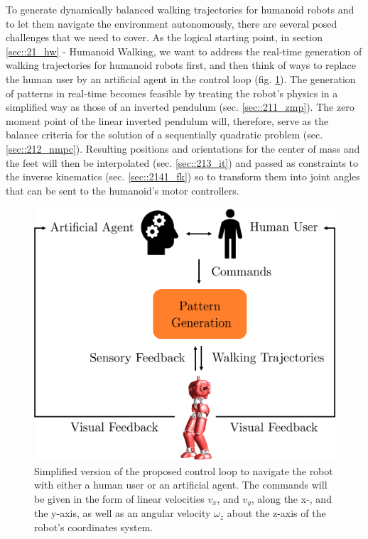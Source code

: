 \label{sec::2_bg}
To generate dynamically balanced walking trajectories for humanoid robots and to let them navigate the environment autonomously, there are several posed challenges that we need to cover. As the logical starting point, in section \ref{sec::21_hw} - Humanoid Walking, we want to address the real-time generation of walking trajectories for humanoid robots first, and then think of ways to replace the human user by an artificial agent in the control loop (fig. \ref{fig::2_cl}). The generation of patterns in real-time becomes feasible by treating the robot's physics in a simplified way as those of an inverted pendulum (sec. \ref{sec::211_zmp}). The zero moment point of the linear inverted pendulum will, therefore, serve as the balance criteria for the solution of a sequentially quadratic problem (sec. \ref{sec::212_nmpc}).  Resulting positions and orientations for the center of mass and the feet will then be interpolated (sec. \ref{sec::213_it}) and passed as constraints to the inverse kinematics (sec. \ref{sec::2141_fk}) so to transform them into joint angles that can be sent to the humanoid's motor controllers.
\begin{figure}[h!]
	\centering
	\includegraphics[scale=.5]{chapters/02_background/img/control_loop.png}
	\caption{Simplified version of the proposed control loop to navigate the robot with either a human user or an artificial agent. The commands will be given in the form of linear velocities $v_x$, and $v_y$, along the x-, and the y-axis, as well as an angular velocity $\omega_z$ about the z-axis of the robot's coordinates system.}
	\label{fig::2_cl}
\end{figure}
